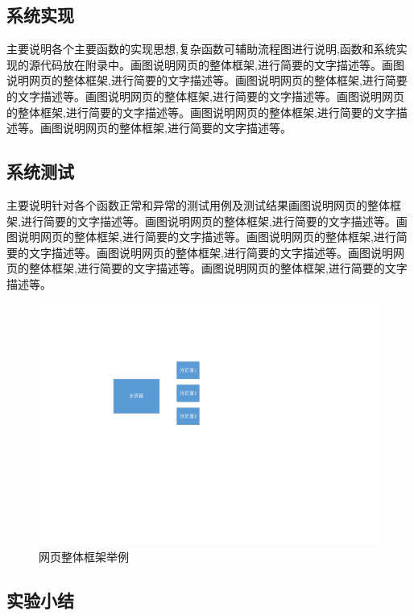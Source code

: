 \documentclass[supercite]{Experimental_Report}
\theoremstyle{definition}
\begin{document}
\subsection{系统实现}

主要说明各个主要函数的实现思想,复杂函数可辅助流程图进行说明,函数和系统实现的源代码放在附录中。画图说明网页的整体框架,进行简要的文字描述等。画图说明网页的整体框架,进行简要的文字描述等。画图说明网页的整体框架,进行简要的文字描述等。画图说明网页的整体框架,进行简要的文字描述等。画图说明网页的整体框架,进行简要的文字描述等。画图说明网页的整体框架,进行简要的文字描述等。画图说明网页的整体框架,进行简要的文字描述等。

\subsection{系统测试}

主要说明针对各个函数正常和异常的测试用例及测试结果画图说明网页的整体框架,进行简要的文字描述等。画图说明网页的整体框架,进行简要的文字描述等。画图说明网页的整体框架,进行简要的文字描述等。画图说明网页的整体框架,进行简要的文字描述等。画图说明网页的整体框架,进行简要的文字描述等。画图说明网页的整体框架,进行简要的文字描述等。画图说明网页的整体框架,进行简要的文字描述等。

\begin{figure}[htb] %
	\begin{center}
		\includegraphics[scale=0.80]{images/1-1.pdf}
		\caption{网页整体框架举例}
		\label{fig4-1}
	\end{center}
\end{figure}

\subsection{实验小结}
\end{document}
